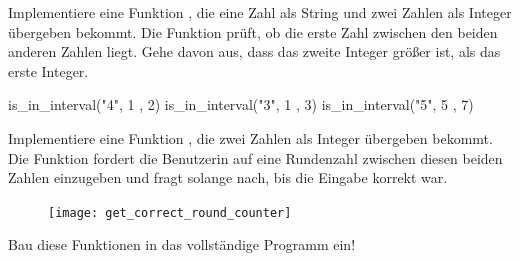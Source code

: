 \documentclass[a4paper, DIV = calc]{scrartcl}
\begin{document}
\begin{aufgabe}
\noindent
Implementiere eine Funktion , die eine Zahl als String und zwei Zahlen als Integer übergeben bekommt. Die Funktion prüft, ob die erste Zahl zwischen den beiden anderen Zahlen liegt. Gehe davon aus, dass das zweite Integer größer ist, als das erste Integer.
\begin{pyconsole}
is_in_interval("4", 1 , 2)
is_in_interval("3", 1 , 3)
is_in_interval("5", 5 , 7)
\end{pyconsole}
\end{aufgabe}



\begin{aufgabe}
\noindent
Implementiere eine Funktion , die zwei Zahlen als Integer übergeben bekommt. Die Funktion fordert die Benutzerin auf eine Rundenzahl zwischen diesen beiden Zahlen einzugeben und fragt solange nach, bis die Eingabe korrekt war.
\end{aufgabe}

\begin{figure}[H]
	\centering	
	\texttt{[image: get\_correct\_round\_counter]}

\end{figure}

\begin{aufgabe}
Bau diese Funktionen in das vollständige Programm ein! 
\end{aufgabe}
\end{document}

